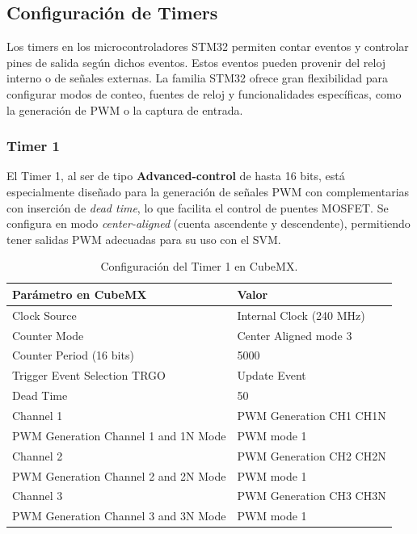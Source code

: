 \documentclass[11pt]{report}
\begin{document}
\subsection{Configuración de Timers}
Los timers en los microcontroladores STM32 permiten contar eventos y controlar pines de salida según dichos eventos. Estos eventos pueden provenir del reloj interno o de señales externas. La familia STM32 ofrece gran flexibilidad para configurar modos de conteo, fuentes de reloj y funcionalidades específicas, como la generación de PWM o la captura de entrada.

\subsubsection{Timer 1}
El Timer 1, al ser de tipo \textbf{Advanced-control} de hasta 16 bits, está especialmente diseñado para la generación de señales PWM con complementarias con inserción de \emph{dead time}, lo que facilita el control de puentes MOSFET. Se configura en modo \emph{center-aligned} (cuenta ascendente y descendente), permitiendo tener salidas PWM adecuadas para su uso con el SVM.

\begin{table}[h!]
	\centering
	\begin{tabular}{| l | l |}
		\hline
		\textbf{Parámetro en CubeMX}         & \textbf{Valor}           \\
		\hline
		Clock Source                         & Internal Clock (240 MHz) \\
		Counter Mode                         & Center Aligned mode 3    \\
		Counter Period (16 bits)             & 5000                     \\
		Trigger Event Selection TRGO         & Update Event             \\
		Dead Time                            & 50                       \\
		\hline
		Channel 1                            & PWM Generation CH1 CH1N  \\
		PWM Generation Channel 1 and 1N Mode & PWM mode 1               \\
		\hline
		Channel 2                            & PWM Generation CH2 CH2N  \\
		PWM Generation Channel 2 and 2N Mode & PWM mode 1               \\
		\hline
		Channel 3                            & PWM Generation CH3 CH3N  \\
		PWM Generation Channel 3 and 3N Mode & PWM mode 1               \\
		\hline
	\end{tabular}
	\caption{Configuración del Timer 1 en CubeMX.}
	\label{TIM1_config}
\end{table}
\FloatBarrier
\end{document}
